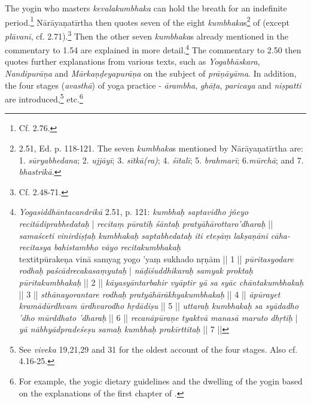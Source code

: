 The yogin who masters \textit{kevalakumbhaka} can hold the breath for an indefinite period.\footnote{Cf.  2.76.} Nārāyaṇatīrtha then quotes seven of the eight \textit{kumbhaka}s\footnote{ 2.51, Ed. p. 118-121. The seven \textit{kumbhaka}s mentioned by Nārāyaṇatīrtha are: 1. \textit{sūryabhedana}; 2. \textit{ujjāyī}; 3. \textit{sītkā(ra)}; 4. \textit{śītalī}; 5. \textit{brahmarī}; 6.\textit{mūrchā}; and 7. \textit{bhastrikā}.} of  (except \textit{plāvanī}, cf.  2.71).\footnote{Cf.  2.48-71.} Then the other seven \textit{kumbhaka}s already mentioned in the commentary to 1.54 are explained in more detail.\footnote{\textit{Yogasiddhāntacandrikā} 2.51, p. 121: \textit{kumbhaḥ saptavidho jñeyo recitādiprabhedataḥ} | \textit{recitaṃ pūratiḥ śāntaḥ pratyāhārottaro'dharaḥ} || \textit{samaśceti vinirdiṣṭaḥ kumbhakaḥ saptabhedataḥ} \textit{iti eteṣāṃ lakṣaṇāni cāha-} \textit{recitasya bahistambho vāyo recitakumbhakaḥ} \\textit{pūrakeṇa vinā samyag yogo 'yaṃ sukhado nṛṇām} || 1 || \textit{pūritasyodare rodhaḥ paścādrecakasaṃyutaḥ} | \textit{nāḍīśuddhikaraḥ samyak proktaḥ pūritakumbhakaḥ} || 2 || \textit{kāyasyāntarbahir vyāptir yā sa syāc chāntakumbhakaḥ} || 3 || \textit{sthānayorantare rodhaḥ pratyāhārākhyakumbhakaḥ} || 4 || \textit{āpūrayet kramādūrdhvam ūrdhvarodho hṛdādiṣu} || 5 || \textit{uttaraḥ kumbhakaḥ sa syādadho 'dho mūrddhato 'dharaḥ} || 6 || \textit{recanāpūraṇe tyaktvā manasā maruto dhṛtiḥ} | \textit{yā nābhyādpradeśeṣu samaḥ kumbhaḥ prakīrttitaḥ} || 7 ||} The commentary to 2.50 then quotes further explanations from various texts, such as \textit{Yogabhāskara}, \textit{Nandipurāṇa} and \textit{Mārkaṇḍeyapurāṇa} on the subject of \textit{prāṇāyāma}. In addition, the four stages (\textit{avasthā}) of yoga practice - \textit{ārambha}, \textit{ghāṭa}, \textit{paricaya} and \textit{niṣpatti} are introduced,\footnote{See  \textit{viveka} 19,21,29 and 31 for the oldest account of the four stages. Also cf.  4.16-25.} etc.\footnote{For example, the yogic dietary guidelines and the dwelling of the yogin based on the explanations of the first chapter of .}

